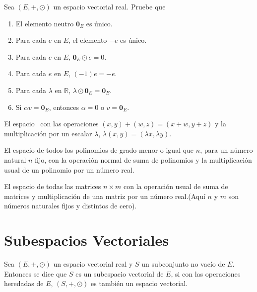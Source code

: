 \begin{trabajoautonomo}
Sea $(E, +, \odot)$ un espacio vectorial real. Pruebe que
\begin{enumerate}
\item El elemento neutro $\mathbf{0}_E$ es único.
\item Para cada $e$ en $E$, el elemento $-e$ es único.
\item Para cada $e$ en $E$, $\mathbf{0}_E \odot e = 0$.
\item Para cada $e$ en $E$, $(-1)e = -e$.
\item Para cada $\lambda$ en $\mathbb{R}$, $\lambda \odot \mathbf{0}_E = \mathbf{0}_E$.
\item Si $\alpha v = \mathbf{0}_E$, entonces $\alpha = 0$ o $v=\mathbf{0}_E$.

\end{enumerate}
\end{trabajoautonomo}
\begin{ejemplo}

El espacio \rdos \ con las operaciones $(x,y)+(w,z) = (x+w,y+z)$ y la multiplicación por un escalar $\lambda$, $\lambda (x,y) = (\lambda x,\lambda y)$.

\end{ejemplo}

\begin{ejemplo}
El espacio de todos los polinomios de grado menor o igual que $n$, para un número natural $n$ fijo, con la operación normal de suma de polinomios y la multiplicación usual de un polinomio por un número real.
\end{ejemplo}

\begin{ejemplo}
El espacio de todas las matrices $n \times m$ con la operación usual de suma de matrices y multiplicación de una matriz por un número real.(Aquí $n$ y $m$ son números naturales fijos y distintos de cero).


\end{ejemplo}



\section{Subespacios Vectoriales}
\begin{dfn}
Sea $(E, +, \odot)$ un espacio vectorial real y $S$ un subconjunto no vacío de $E$. Entonces se dice que $S$ es un subespacio vectorial de $E$, si con las operaciones heredadas de $E$, $(S, +, \odot)$ es también un espacio vectorial.
\end{dfn}


